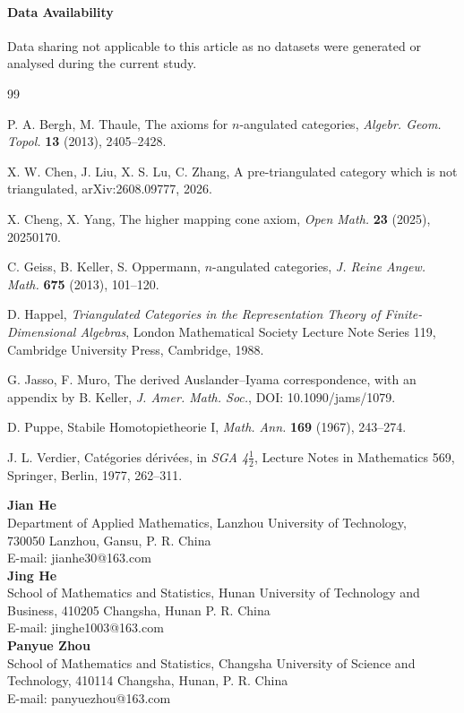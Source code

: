 \documentclass[12pt, twoside]{article}
\numberwithin{equation}{section}
\begin{document}
\paragraph{Data Availability}
Data sharing not applicable to this article as no datasets were generated or analysed during the current study.








\begin{thebibliography}{99}
\addtolength{\itemsep}{-0.5em}

 P. A. Bergh, M. Thaule, The axioms for $n$-angulated categories, \emph{Algebr. Geom. Topol.} \textbf{13} (2013), 2405--2428.

 X. W. Chen, J. Liu, X. S. Lu, C. Zhang, A pre-triangulated category which is not triangulated, arXiv:2608.09777, 2026.

 X. Cheng, X. Yang, The higher mapping cone axiom, \emph{Open Math.} \textbf{23} (2025), 20250170.


 C. Geiss, B. Keller, S. Oppermann, $n$-angulated categories, \emph{J. Reine Angew. Math.} \textbf{675} (2013), 101--120.



 D. Happel, \emph{Triangulated Categories in the Representation Theory of Finite-Dimensional Algebras}, London Mathematical Society Lecture Note Series 119, Cambridge University Press, Cambridge, 1988.

 G. Jasso, F. Muro, The derived Auslander--Iyama correspondence, with an appendix by B. Keller, \emph{J. Amer. Math. Soc.}, DOI: 10.1090/jams/1079.





 D. Puppe, Stabile Homotopietheorie I, \emph{Math. Ann.} \textbf{169} (1967), 243--274.

 J. L. Verdier, Cat\'egories d\'eriv\'ees, in \emph{SGA 4$\frac{1}{2}$}, Lecture Notes in Mathematics 569, Springer, Berlin, 1977, 262--311.
\end{thebibliography}
\textbf{Jian He}\\
Department of Applied Mathematics, Lanzhou University of Technology,\\
730050 Lanzhou, Gansu, P. R. China\\
E-mail: \textsf{jianhe30@163.com}\\[0.3cm]
\textbf{Jing He}\\
School of Mathematics and Statistics, Hunan University of Technology and Business, 410205 Changsha, Hunan P. R. China\\
E-mail: \textsf{jinghe1003@163.com}
\\[0.3cm]
\textbf{Panyue Zhou}\\
School of Mathematics and Statistics, Changsha University of Science and Technology, 410114 Changsha, Hunan,  P. R. China\\
E-mail: \textsf{panyuezhou@163.com}
\end{document}

